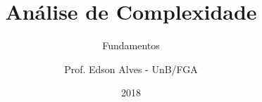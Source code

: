 \title{Análise de Complexidade}
\subtitle{Fundamentos}
\author{Prof. Edson Alves - UnB/FGA}
\date{2018}
